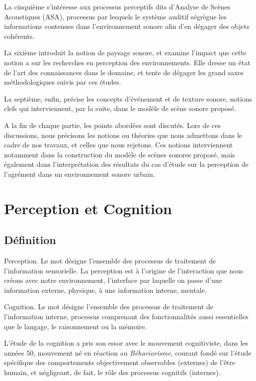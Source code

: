 La cinquième s'intéresse aux processus perceptifs dits d'Analyse de Scènes Acoustiques (ASA), processus par lesquels le système auditif ségrègue les informations contenues dans l'environnement sonore afin d'en dégager des objets cohérents.
 
La sixième introduit la notion de paysage sonore, et examine l'impact que cette notion a sur les recherches en perception des environnements. Elle dresse un état de l'art des connaissances dans le domaine, et tente de dégager les grand saxes méthodologiques suivis par ces études.

La septième, enfin, précise les concepts d'événement et de texture sonore, notions clefs qui interviennent, par la suite, dans le modèle de scène sonore proposé.

A la fin de chaque partie, les points abordées sont discutés. Lors de ces discussions, nous précisons les notions ou théories que nous admettons dans le cadre de nos travaux, et celles que nous rejetons. Ces notions interviennent notamment dans la construction du modèle de scènes sonores proposé, mais également dans l'interprétation des résultats du cas d'étude sur la perception de l'agrément dans un environnement sonore urbain.

\section{Perception et Cognition}
\label{sec:ch3_perceptionCognition}

\subsection{Définition}
\label{sec:ch3_perceptionCognitionDef}


Perception. Le mot désigne l'ensemble des processus de traitement de l'information sensorielle. La perception est à l'origine de l'interaction que nous créons avec notre environnement, l'interface par laquelle on passe d'une information externe, physique, à une information interne, mentale.

Cognition. Le mot désigne l'ensemble des processus de traitement de l'information interne, processus comprenant des fonctionnalités aussi essentielles que le langage, le raisonnement ou la mémoire.

L'étude de la cognition a pris son essor avec le mouvement cognitiviste, dans les années 50, mouvement né en réaction au \emph{Béhaviorisme}, courant fondé sur l'étude spécifique des comportements objectivement observables (externes) de l'être humain, et négligeant, de fait, le rôle des processus cognitifs (internes).

